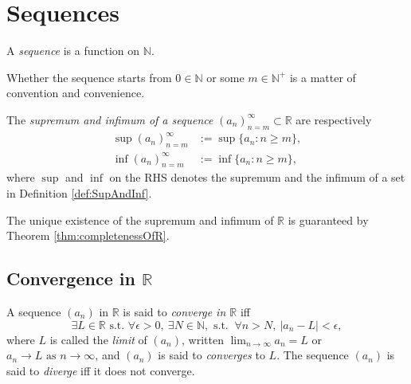 
\section{Sequences}
\label{sec:sequences}

\begin{defn}
  A \emph{sequence} is a function on $\mathbb{N}$.
\end{defn}

\begin{rem}
  Whether the sequence starts from $0\in\mathbb{N}$
  or some $m\in \mathbb{N}^+$
  is a matter of convention and convenience.
\end{rem}

\begin{defn}
  The \emph{supremum and infimum of a sequence}
  $(a_n)_{n=m}^{\infty}\subset \mathbb{R}$ are respectively 
  \begin{align}
    \label{eq:supSequence}
    \sup(a_n)_{n=m}^{\infty}
    &:= \sup \{a_n: n\ge m\},
    \\
    \label{eq:infSequence}
    \inf(a_n)_{n=m}^{\infty}
    &:= \inf \{a_n: n\ge m\},
  \end{align}
  where $\sup$ and $\inf$ on the RHS
  denotes the supremum and the infimum of a set
  in Definition \ref{def:SupAndInf}. 
\end{defn}

\begin{rem}
  The unique existence of the supremum and infimum of $\mathbb{R}$
  is guaranteed by Theorem \ref{thm:completenessOfR}.
\end{rem}


\subsection{Convergence in $\mathbb{R}$}
\label{sec:convergenceOfSequenceInR}

\begin{defn}
  \label{def:limitOfSequence}
  A sequence $(a_n)$ in $\mathbb{R}$
  is said to \emph{converge in $\mathbb{R}$} iff
  \begin{equation}
    \label{eq:limitOfSequence}
    \exists L\in \mathbb{R} \text{ s.t. }  
    \forall \epsilon>0,\ \exists N\in \mathbb{N}, \text{ s.t. }\ 
    \forall n>N, \ |a_n-L| < \epsilon, 
  \end{equation}
  where $L$ is called the \emph{limit} of $(a_n)$, 
  written $\lim_{n\rightarrow \infty} a_n = L$
  or 
  \mbox{$a_n\rightarrow L \text{ as } n\rightarrow\infty$}, 
  and $(a_n)$ is said to \emph{converges} to $L$.
  The sequence $(a_n)$ is said to \emph{diverge}
  iff it does not converge.
\end{defn}


